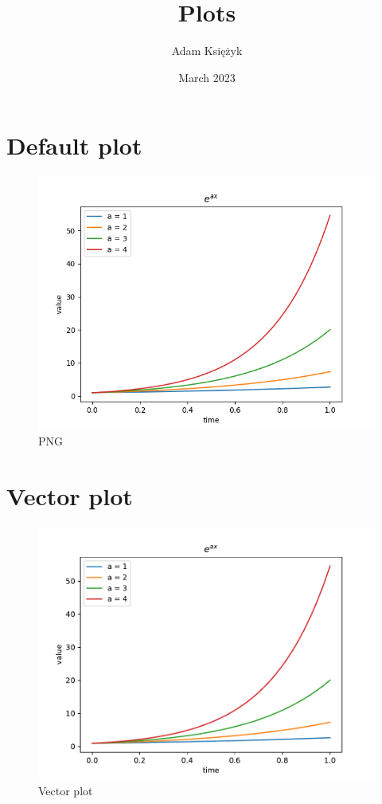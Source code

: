 \documentclass{article}
\title{Plots}
\author{Adam Księżyk}
\date{March 2023}
\begin{document}
\maketitle
\clearpage

\section{Default plot}
\lipsum[1]
\begin{figure}[!ht]
    \centering
    \includegraphics[width=\textwidth]{images/plot1.png}
    \caption{PNG}
    \label{fig:plot_1}
\end{figure}
\clearpage

\section{Vector plot}
\lipsum[2-3]
\begin{figure}[!ht]
    \centering
    \includegraphics[width=\textwidth]{images/plot2.pdf}
    \caption{Vector plot}
    \label{fig:plot_2}
\end{figure}
\clearpage
\end{document}
